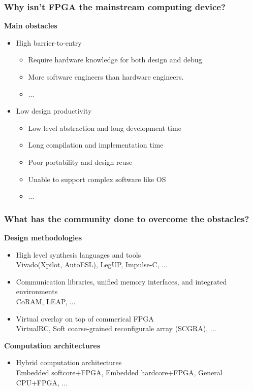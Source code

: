 \documentclass{beamer}
\begin{document}
\begin{frame}[t]

\frametitle{Why isn't FPGA the mainstream computing device?}
\textbf{Main obstacles}
\begin{itemize}

\item High barrier-to-entry
\begin{itemize}
\item Require hardware knowledge for both design and debug.
\item More software engineers than hardware engineers.
\item ...
\end{itemize}

\item Low design productivity
\begin{itemize}
\item Low level abstraction and long development time
\item Long compilation and implementation time
\item Poor portability and design reuse
\item Unable to support complex software like OS
\item ...
\end{itemize}

\end{itemize}

\end{frame}

\begin{frame}[t]
\frametitle{What has the community done to overcome the obstacles?}

\textbf{Design methodologies}
\begin{itemize}
\item High level synthesis languages and tools \\
\footnotesize
Vivado(Xpilot, AutoESL), LegUP, Impulse-C, ...
\normalsize

\item Communication libraries, unified memory interfaces, and integrated environments \\
\footnotesize
CoRAM, LEAP, ...
\normalsize

\item Virtual overlay on top of commerical FPGA \\
\footnotesize 
VirtualRC, Soft coarse-grained reconfigurale array (SCGRA), ...
\normalsize

\end{itemize}

\textbf{Computation architectures}
\begin{itemize}
\item Hybrid computation architectures \\
\footnotesize
Embedded softcore+FPGA, Embedded hardcore+FPGA, General CPU+FPGA, ...
\normalsize
\end{itemize}

\end{frame}
\end{document}
